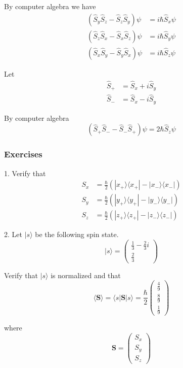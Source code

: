 By computer algebra we have
\begin{align*}
(\hat S_y\hat S_z-\hat S_z\hat S_y)\psi&=i\hbar\hat S_x\psi
\\
(\hat S_z\hat S_x-\hat S_x\hat S_z)\psi&=i\hbar\hat S_y\psi
\\
(\hat S_x\hat S_y-\hat S_y\hat S_x)\psi&=i\hbar\hat S_z\psi
\end{align*}

Let
\begin{align*}
\hat S_+&=\hat S_x+i\hat S_y
\\
\hat S_-&=\hat S_x-i\hat S_y
\end{align*}

By computer algebra
\begin{equation*}
(\hat S_+\hat S_--\hat S_-\hat S_+)\psi=2\hbar\hat S_z\psi
\end{equation*}

\subsubsection*{Exercises}

1. Verify that
\begin{align*}
S_x&=\frac{\hbar}{2}\left(|x_+\rangle\langle x_+|-|x_-\rangle\langle x_-|\right)
\\
S_y&=\frac{\hbar}{2}\left(|y_+\rangle\langle y_+|-|y_-\rangle\langle y_-|\right)
\\
S_z&=\frac{\hbar}{2}\left(|z_+\rangle\langle z_+|-|z_-\rangle\langle z_-|\right)
\end{align*}

2. Let $|s\rangle$ be the following spin state.
\begin{equation*}
|s\rangle=\begin{pmatrix}\frac{1}{3}-\frac{2}{3}i\\[1ex]\frac{2}{3}\end{pmatrix}
\end{equation*}

Verify that $|s\rangle$ is normalized and that
\begin{equation*}
\langle\mathbf S\rangle
=\langle s|\mathbf S|s\rangle
=\frac{\hbar}{2}\begin{pmatrix}\frac{4}{9}\\[1ex]\frac{8}{9}\\[1ex]\frac{1}{9}\end{pmatrix}
\end{equation*}

where
\begin{equation*}
\mathbf S=\begin{pmatrix}S_x\\S_y\\S_z\end{pmatrix}
\end{equation*}


